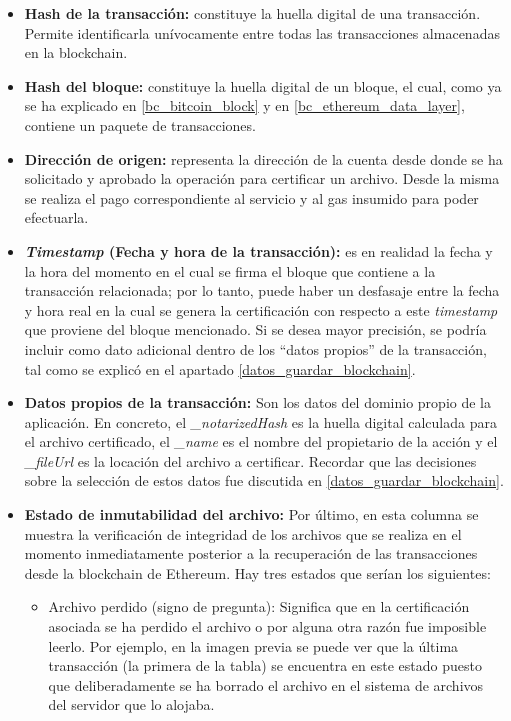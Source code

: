 \begin{itemize}
  \item \textbf{Hash de la transacción:} constituye la huella digital de una transacción. Permite identificarla unívocamente entre todas las transacciones almacenadas en la blockchain.
  \item \textbf{Hash del bloque:} constituye la huella digital de un bloque, el cual, como ya se ha explicado en \ref{bc_bitcoin_block} y en \ref{bc_ethereum_data_layer}, contiene un paquete de transacciones.
  \item \textbf{Dirección de origen:} representa la dirección de la cuenta desde donde se ha solicitado y aprobado la operación para certificar un archivo. Desde la misma se realiza el pago correspondiente al servicio y al gas insumido para poder efectuarla.
  \item \textbf{\textit{Timestamp} (Fecha y hora de la transacción):} es en realidad la fecha y la hora del momento en el cual se firma el bloque que contiene a la transacción relacionada; por lo tanto, puede haber un desfasaje entre la fecha y hora real en la cual se genera la certificación con respecto a este \textit{timestamp} que proviene del bloque mencionado. Si se desea mayor precisión, se podría incluir como dato adicional dentro de los ``datos propios'' de la transacción, tal como se explicó en el apartado \ref{datos_guardar_blockchain}.
  \item \textbf{Datos propios de la transacción:} Son los datos del dominio propio de la aplicación. En concreto, el \textit{\_notarizedHash} es la huella digital calculada para el archivo certificado, el \textit{\_name} es el nombre del propietario de la acción y el \textit{\_fileUrl} es la locación del archivo a certificar. Recordar que las decisiones sobre la selección de estos datos fue discutida en \ref{datos_guardar_blockchain}.
  \item \textbf{Estado de inmutabilidad del archivo:} Por último, en esta columna se muestra la verificación de integridad de los archivos que se realiza en el momento inmediatamente posterior a la recuperación de las transacciones desde la blockchain de Ethereum. Hay tres estados que serían los siguientes:
  \begin{itemize}
    \item Archivo perdido (signo de pregunta): Significa que en la certificación asociada se ha perdido el archivo o por alguna otra razón fue imposible leerlo. Por ejemplo, en la imagen previa se puede ver que la última transacción (la primera de la tabla) se encuentra en este estado puesto que deliberadamente se ha borrado el archivo en el sistema de archivos del servidor que lo alojaba.

\end{itemize}
\end{itemize}
